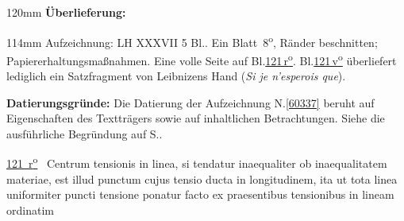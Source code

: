 %
\frenchspacing%
\begin{ledgroupsized}[r]{120mm}%
\footnotesize%
\pstart%
\noindent%
\textbf{Überlieferung:}%
\pend%
\end{ledgroupsized}%
\begin{ledgroupsized}[r]{114mm}%
\footnotesize%
\pstart%
\parindent -6mm%
%
Aufzeichnung:
LH XXXVII 5 Bl..
Ein Blatt~8\textsuperscript{o},
Ränder beschnitten;
Papiererhaltungsmaßnahmen.
Eine volle Seite auf Bl.\;\href{\Scan{LH_37_05_121r}}{121\,r\textsuperscript{o}}.
Bl.\;\href{\Scan{LH_37_05_121v}}{121\,v\textsuperscript{o}} überliefert lediglich ein Satzfragment von Leibnizens Hand (\textit{Si je n'esperois que}).
\pend%
\end{ledgroupsized}%
\vspace{5mm}%
\begin{ledgroup}%
\footnotesize%
\pstart%
\noindent%
\textbf{Datierungsgründe:}
Die Datierung der Aufzeichnung N.\;\ref{60337} beruht auf Eigenschaften des Textträgers sowie auf inhaltlichen Betrachtungen.
Siehe die ausführliche Begründung auf S.\;\pageref{60337_dat}.%
\pend%
\end{ledgroup}%
%
\frenchspacing%
\vspace{8mm}%
\normalsize%
\pstart%
\noindent%
\lbrack%
\href{\Scan{LH_37_05_121r}}%
{121~r\textsuperscript{o}}%
\rbrack\
Centrum tensionis%
%
in linea,%
si tendatur inaequaliter
ob inaequalitatem materiae,%
%
est illud punctum %
cujus tensio ducta in longitudinem,%
ita ut tota linea uniformiter puncti tensione%
ponatur%
facto ex praesentibus tensionibus%
in lineam ordinatim%
